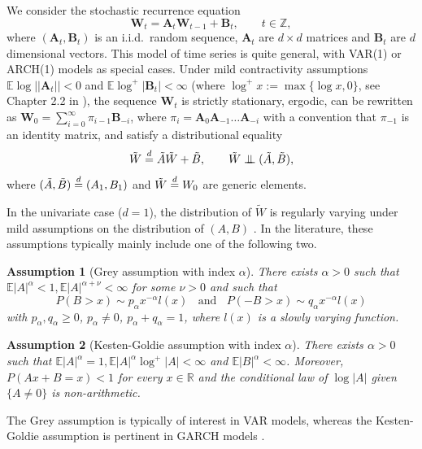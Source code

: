 \documentclass[a4paper,11pt]{article}
\newtheorem*{assumption*}{Assumption}
\newcommand{\indep}{\perp\kern-5.5pt\perp}
\newcommand{\toverset}[2]{\overset{{\rm #1}}{#2}}
\begin{document}
We consider the stochastic recurrence equation \citep[SRE,][]{SRE}
\begin{equation}\label{generalSRE}
    \textbf{W}_t = \textbf{A}_t\textbf{W}_{t-1} + 
 \textbf{B}_t, \qquad t\in\mathbb{Z},
\end{equation}
where $(\textbf{A}_t, \textbf{B}_t)$ is an i.i.d.\ random sequence, $\textbf{A}_t$ are $d\times d$ matrices and $\textbf{B}_t$ are $d$ dimensional vectors. This model of time series is quite general, with VAR(1) or ARCH(1) models as special cases. 
Under mild contractivity assumptions $\mathbb{E}\log||\textbf{A}_t|| < 0$ and $\mathbb{E}\log^+|\textbf{B}_t| < \infty$ (where \(
\log^+ x := \max\{\log x, 0\}
\), see Chapter 2.2 in \cite{SRE}), the sequence $ \textbf{W}_t$ is strictly stationary, ergodic, can be rewritten as $\textbf{W}_0 = \sum_{i=0}^\infty \pi_{i-1}\textbf{B}_{-i}$, where $\pi_i = \textbf{A}_{0}\textbf{A}_{-1}\dots \textbf{A}_{-i}$ with a convention that $\pi_{-1}$ is an identity matrix, and  
satisfy a distributional equality 
\begin{equation*} 
\tilde{\textbf{W}}\toverset{d}{=} \tilde{\textbf{A}} \tilde{\textbf{W}} +  \tilde{\textbf{B}}, \qquad \tilde{\textbf{W}}\indep (\tilde{\textbf{A}},\tilde{\textbf{B}}),
\end{equation*}
where $(\tilde{\textbf{A}},\tilde{\textbf{B}})\toverset{d}{=}({\textbf{A}_1},{\textbf{B}_1})$ and $\tilde{\textbf{W}}\toverset{d}{=}\textbf{W}_0$ are generic elements. 

In the univariate case ($d=1$), the distribution of $\tilde{W}$ is regularly varying under mild assumptions on the distribution of $(A,B)$ \citep{kesten1973random}. In the literature, these assumptions typically mainly include one of the following two. 

\begin{assumption*}[Grey assumption with index $\alpha$]
There exists $\alpha>0$ such that $\mathbb{E}|A|^\alpha < 1, \mathbb{E}|A|^{\alpha+\nu}<\infty$ for some $\nu>0$ and such that
\begin{equation*}
    P(B>x)\sim p_\alpha x^{-\alpha} l(x) \;\; \text{ and } \;\; P(-B>x)\sim q_\alpha x^{-\alpha} l(x) 
\end{equation*}
with $p_\alpha, q_\alpha\geq0$, $p_\alpha\neq 0$, $ p_\alpha+q_\alpha=1$, where $l(x)$ is a slowly varying function.  
\end{assumption*}
\begin{assumption*}[Kesten-Goldie assumption with index $\alpha$]
There exists $\alpha>0$ such that $\mathbb{E}|A|^\alpha = 1, \mathbb{E}|A|^{\alpha}\log^+|A|<\infty$ and $\mathbb{E}|B|^\alpha<\infty$. Moreover, $P(Ax+B=x)<1$ for every $x\in\mathbb{R}$ and the conditional law of $\log|A|$ given $\{A\neq 0\}$ is non-arithmetic. 
\end{assumption*}
The Grey assumption is typically of interest in VAR models, whereas the Kesten-Goldie assumption is pertinent in GARCH models \citep{Pedersen}. 
\end{document}
